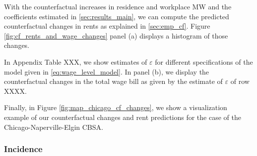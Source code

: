 With the counterfactual increases in residence and workplace MW and the 
coefficients estimated in \ref{sec:results_main}, we can compute the predicted 
counterfactual changes in rents as explained in \ref{sec:emp_cf}. Figure 
\ref{fig:cf_rents_and_wage_changes} panel (a) displays a histogram of those 
changes. 


In Appendix Table XXX, we show estimates of $\varepsilon$ for different specifications of 
the model given in \ref{eq:wage_level_model}. In panel (b), we display the counterfactual 
changes in the total wage bill as given by the estimate of $\varepsilon$ of row XXXX.


Finally, in Figure \ref{fig:map_chicago_cf_changes}, we show a visualization example 
of our counterfactual changes and rent predictions for the case of the 
Chicago-Naperville-Elgin CBSA. 


\subsubsection{Incidence}

